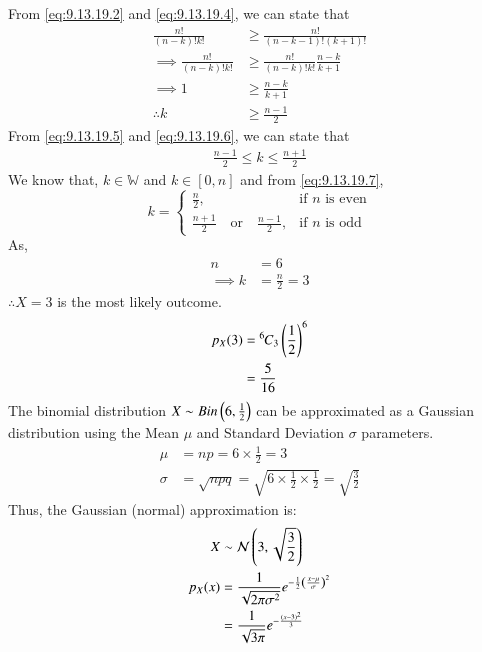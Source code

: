 \documentclass[journal,12pt,twocolumn]{IEEEtran}
\theoremstyle{remark}
\begin{document}
From \eqref{eq:9.13.19.2} and \eqref{eq:9.13.19.4}, we can state that 
\begin{align}
	\frac{n!}{(n-k)!k!} &\geq \frac{n!}{(n-k-1)!(k+1)!}\\
	\implies \frac{n!}{(n-k)!k!} &\geq \frac{n!}{(n-k)!k!}\frac{n-k}{k+1}\\
	\implies 1 &\geq \frac{n-k}{k+1}\\
	\therefore k &\geq \frac{n-1}{2}  \label{eq:9.13.19.6}
\end{align} 
From \eqref{eq:9.13.19.5} and \eqref{eq:9.13.19.6}, we can state that
\begin{align}
    \frac{n-1}{2} \leq k \leq \frac{n+1}{2} \label{eq:9.13.19.7}
\end{align}
We know that, $k \in \mathbb{W}$ and $k \in [0,n]$ and from \eqref{eq:9.13.19.7},
\begin{equation}
    k =
    \begin{cases}
        \frac{n}{2}, & \text{if } n \text{ is even} \\
        \frac{n+1}{2} \quad \text{or} \quad \frac{n-1}{2}, & \text{if } n \text{ is odd} 
    \end{cases}
\end{equation}
As, 
\begin{align}
   	n&=6\\
   	\implies k&=\frac{n}{2}
   	=3
\end{align}
$\therefore X = 3$ is the most likely outcome.
\begin{align}
        p_X(3) &= {{}^{6}\mkern-1muC_{ 3}} \left(\frac{1}{2}\right)^6 \\
        &= \frac{5}{16}
\end{align}
The binomial distribution $X \sim Bin\left(6,\frac{1}{2}\right)$ can be approximated as a Gaussian distribution using the Mean $\mu$ and Standard Deviation $\sigma$ parameters.
\begin{align}
    \mu &= np = 6 \times \frac{1}{2} = 3\\
    \sigma &= \sqrt{npq} = \sqrt{6 \times \frac{1}{2} \times \frac{1}{2}} = \sqrt{\frac{3}{2}}
\end{align}
Thus, the Gaussian (normal) approximation is:
\begin{align}
    X &\sim \mathcal{N}\left(3, \sqrt{\frac{3}{2}}\right)\\
    p_X(x) &= \frac{1}{\sqrt{2\pi\sigma^2}}e^{-\frac{1}{2} \left(\frac{x - \mu}{\sigma}\right)^2}\\
    &= \frac{1}{\sqrt{3\pi}}e^{-\frac{\left(x - 3\right)^2}{3}}
\end{align}
\end{document}
